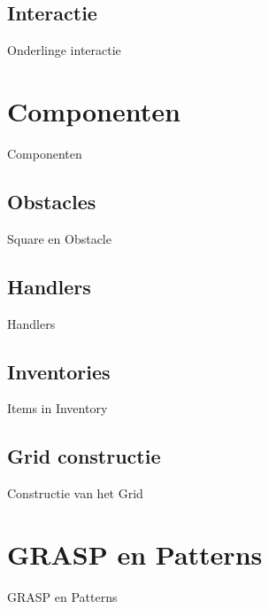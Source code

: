 \documentclass[t]{beamer}
\begin{document}
\subsection{Interactie}
\begin{frame}{Onderlinge interactie}


\end{frame}


\section{Componenten}
\begin{frame}{Componenten}
\begin{multicols}{2}
\tableofcontents[currentsection]
\end{multicols}
\end{frame}

\subsection{Obstacles}
\begin{frame}{Square en Obstacle}

\end{frame}

\subsection{Handlers}
\begin{frame}{Handlers}

\end{frame}

\subsection{Inventories}
\begin{frame}{Items in Inventory}

\end{frame}

\subsection{Grid constructie}
\begin{frame}{Constructie van het Grid}

\end{frame}

\section{GRASP en Patterns}
\begin{frame}{GRASP en Patterns}
\begin{multicols}{2}
\tableofcontents[currentsection]
\end{multicols}
\end{frame}
\end{document}
